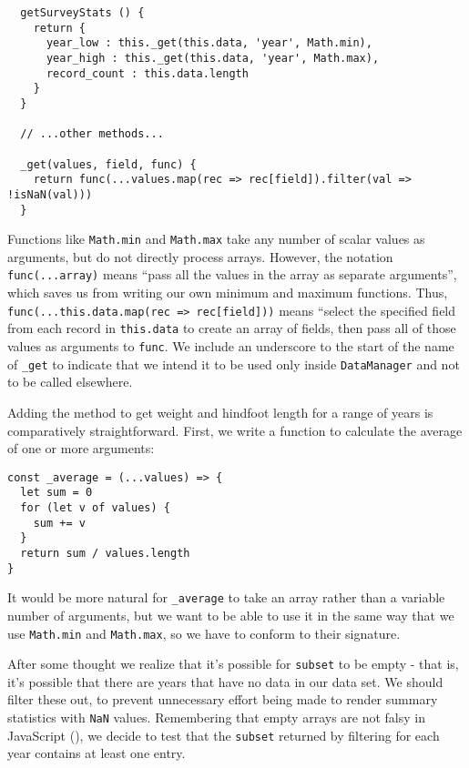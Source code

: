 \begin{verbatim}
  getSurveyStats () {
    return {
      year_low : this._get(this.data, 'year', Math.min),
      year_high : this._get(this.data, 'year', Math.max),
      record_count : this.data.length
    }
  }

  // ...other methods...

  _get(values, field, func) {
    return func(...values.map(rec => rec[field]).filter(val => !isNaN(val)))
  }
\end{verbatim}

Functions like \texttt{Math.min} and \texttt{Math.max} take any number of scalar values as arguments,
but do not directly process arrays.
However, the notation \texttt{func(...array)} means
``pass all the values in the array as separate arguments'',
which saves us from writing our own minimum and maximum functions.
Thus,
\texttt{func(...this.data.map(rec\ =\textgreater{}\ rec[field]))} means
``select the specified field from each record in \texttt{this.data} to create an array of fields,
then pass all of those values as arguments to \texttt{func}.
We include an underscore to the start of the name of \texttt{\_get} to indicate that we
intend it to be used only inside \texttt{DataManager} and not to be called elsewhere.

Adding the method to get weight and hindfoot length for a range of years
is comparatively straightforward.
First,
we write a function to calculate the average of one or more arguments:

\begin{verbatim}
const _average = (...values) => {
  let sum = 0
  for (let v of values) {
    sum += v
  }
  return sum / values.length
}
\end{verbatim}

It would be more natural for \texttt{\_average} to take an array rather than a variable number of arguments,
but we want to be able to use it in the same way that we use \texttt{Math.min} and \texttt{Math.max},
so we have to conform to their signature.

After some thought we realize that it's possible for \texttt{subset} to be empty -
that is, it's possible that there are years that have no data in our data set.
We should filter these out,
to prevent unnecessary effort being made to render summary statistics with \texttt{NaN} values.
Remembering that empty arrays are not falsy in JavaScript (),
we decide to test that the \texttt{subset} returned by filtering for each year
contains at least one entry.

